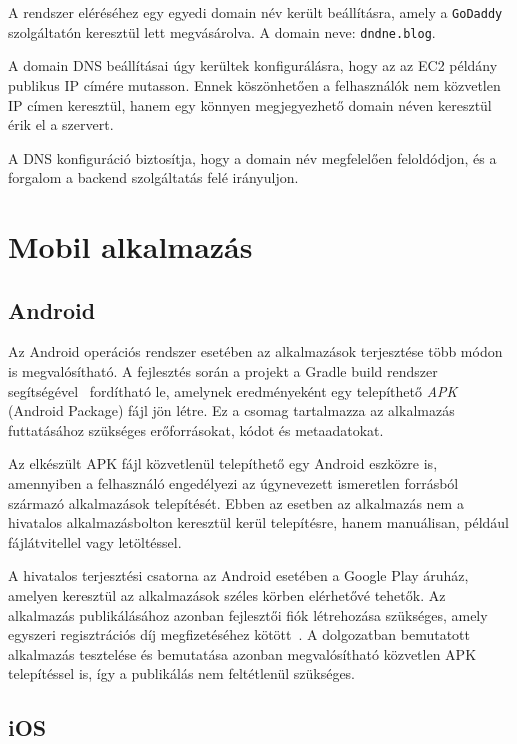\documentclass[
]{thesis-ekf}
\theoremstyle{definition}
\theoremstyle{remark}
\begin{document}
A rendszer eléréséhez egy egyedi domain név került beállításra, amely a \texttt{GoDaddy} szolgáltatón keresztül lett megvásárolva. A domain neve: \texttt{dndne.blog}.

A domain DNS beállításai úgy kerültek konfigurálásra, hogy az az EC2 példány publikus IP címére mutasson. Ennek köszönhetően a felhasználók nem közvetlen IP címen keresztül, hanem egy könnyen megjegyezhető domain néven keresztül érik el a szervert.

A DNS konfiguráció biztosítja, hogy a domain név megfelelően feloldódjon, és a forgalom a backend szolgáltatás felé irányuljon.

\section{Mobil alkalmazás}

\subsection{Android}

Az Android operációs rendszer esetében az alkalmazások terjesztése több módon is megvalósítható. A fejlesztés során a projekt a Gradle build rendszer segítségével~\cite{gradle} fordítható le, amelynek eredményeként egy telepíthető \emph{APK} (Android Package) fájl jön létre. Ez a csomag tartalmazza az alkalmazás futtatásához szükséges erőforrásokat, kódot és metaadatokat.

Az elkészült APK fájl közvetlenül telepíthető egy Android eszközre is, amennyiben a felhasználó engedélyezi az úgynevezett ismeretlen forrásból származó alkalmazások telepítését. Ebben az esetben az alkalmazás nem a hivatalos alkalmazásbolton keresztül kerül telepítésre, hanem manuálisan, például fájlátvitellel vagy letöltéssel.

A hivatalos terjesztési csatorna az Android esetében a Google Play áruház, amelyen keresztül az alkalmazások széles körben elérhetővé tehetők. Az alkalmazás publikálásához azonban fejlesztői fiók létrehozása szükséges, amely egyszeri regisztrációs díj megfizetéséhez kötött~\cite{google_play_registration_fee}. A dolgozatban bemutatott alkalmazás tesztelése és bemutatása azonban megvalósítható közvetlen APK telepítéssel is, így a publikálás nem feltétlenül szükséges.

\subsection{iOS}
\end{document}
